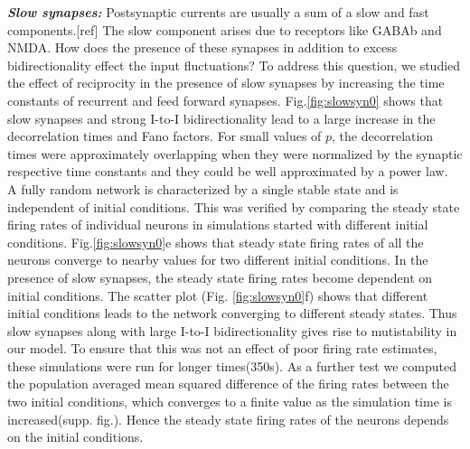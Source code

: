 \emph{\textbf{Slow synapses:}} Postsynaptic currents are usually a sum of a slow and fast components.[ref] The slow component arises due to receptors like GABAb and NMDA. How does the presence of these synapses in addition to excess bidirectionality effect the input fluctuations? To address this question, we studied the effect of reciprocity in the presence of slow synapses by increasing the time constants of recurrent and feed forward synapses. Fig.\ref{fig:slowsyn0} shows that slow synapses and strong I-to-I bidirectionality lead to a large increase in the decorrelation times and Fano factors. For small values of $p$, the decorrelation times were approximately overlapping when they were normalized by the synaptic respective time constants and they could be well approximated by a power law. \\  
A fully random network is characterized by a single stable state and is independent of initial conditions. This was verified by comparing the steady state firing rates of individual neurons in simulations started with different initial conditions. Fig.\ref{fig:slowsyn0}e shows that steady state firing rates of all the neurons converge to nearby values for two different initial conditions. In the presence of slow synapses, the steady state firing rates become dependent on initial conditions. The scatter plot (Fig. \ref{fig:slowsyn0}f) shows that different initial conditions leads to the network converging to different steady states. Thus slow synapses along with large I-to-I bidirectionality gives rise to mutistability in our model. To ensure that this was not an effect of poor firing rate estimates, these simulations were run for longer times(350s). As a further test we computed the population averaged mean squared difference of the firing rates between the two initial conditions, which converges to a finite value as the simulation time is increased(supp. fig.). Hence the steady state firing rates of the neurons depends on the initial conditions. \\

